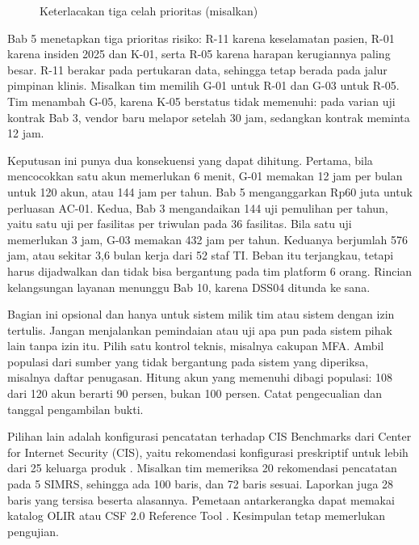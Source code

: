 \begin{figure}[!htb]
  \centering
  
  \caption{Keterlacakan tiga celah prioritas (misalkan)}
  \label{fig:ch06-keterlacakan}
\end{figure}

\begin{kasus}[title={Kasus Medikara Health: Tiga Prioritas untuk Bab 8}]
Bab 5 menetapkan tiga prioritas risiko: R-11 karena keselamatan pasien, R-01 karena insiden 2025 dan
K-01, serta R-05 karena harapan kerugiannya paling besar. R-11 berakar pada pertukaran data, sehingga
tetap berada pada jalur pimpinan klinis. Misalkan tim memilih G-01 untuk R-01 dan G-03 untuk R-05. Tim
menambah G-05, karena K-05 berstatus tidak memenuhi: pada varian uji kontrak Bab 3, vendor baru
melapor setelah 30 jam, sedangkan kontrak meminta 12 jam.

Keputusan ini punya dua konsekuensi yang dapat dihitung. Pertama, bila mencocokkan satu akun memerlukan
6 menit, G-01 memakan 12 jam per bulan untuk 120 akun, atau 144 jam per tahun. Bab 5 menganggarkan
Rp60 juta untuk perluasan AC-01. Kedua, Bab 3 mengandaikan 144 uji pemulihan per tahun, yaitu satu uji
per fasilitas per triwulan pada 36 fasilitas. Bila satu uji memerlukan 3 jam, G-03 memakan 432 jam per
tahun. Keduanya berjumlah 576 jam, atau sekitar 3,6 bulan kerja dari 52 staf TI. Beban itu terjangkau,
tetapi harus dijadwalkan dan tidak bisa bergantung pada tim platform 6 orang. Rincian kelangsungan
layanan menunggu Bab 10, karena DSS04 ditunda ke sana.
\end{kasus}

\begin{pendalaman}
Bagian ini opsional dan hanya untuk sistem milik tim atau sistem dengan izin tertulis. Jangan
menjalankan pemindaian atau uji apa pun pada sistem pihak lain tanpa izin itu. Pilih satu kontrol
teknis, misalnya cakupan MFA. Ambil populasi dari sumber yang tidak bergantung pada sistem yang
diperiksa, misalnya daftar penugasan. Hitung akun yang memenuhi dibagi populasi: 108 dari 120 akun
berarti 90 persen, bukan 100 persen. Catat pengecualian dan tanggal pengambilan bukti.

Pilihan lain adalah konfigurasi pencatatan terhadap CIS Benchmarks dari Center for Internet Security
(CIS), yaitu rekomendasi konfigurasi preskriptif untuk lebih dari 25 keluarga produk
\cite{c06-cis-benchmarks}. Misalkan tim memeriksa 20 rekomendasi pencatatan pada 5 SIMRS, sehingga ada
100 baris, dan 72 baris sesuai. Laporkan juga 28 baris yang tersisa beserta alasannya. Pemetaan
antarkerangka dapat memakai katalog OLIR atau CSF 2.0 Reference Tool \cite{c06-nist-sp1347}. Kesimpulan
tetap memerlukan pengujian.
\end{pendalaman}

